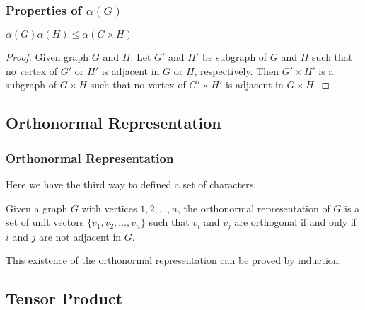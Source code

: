 \documentclass{beamer}
\begin{document}
                  \begin{frame}
                        \frametitle{Properties of $\alpha(G)$}
                        \begin{lemma}
                              $\alpha(G)\alpha(H) \leq \alpha(G \times H)$
                        \end{lemma}
            
                        \pause
            
                        \begin{proof}
                              Given graph $ G $ and $ H $. Let $ G' $ and $ H' $ be subgraph of $ G $ and $ H $ such that no vertex of $ G' $ or $ H' $ is adjacent in $ G $ or $ H $, respectively. Then $ G' \times H' $ is a subgraph of $ G \times H $ such that no vertex of $ G' \times H' $ is adjacent in $ G \times H $.
                        \end{proof}
                  \end{frame}

            \subsection{Orthonormal Representation}

                  \begin{frame}
                        \frametitle{Orthonormal Representation}

                        Here we have the third way to defined a set of characters.

                        \begin{definition}\label{def:orthonormalRepresentation}
                              Given a graph $ G $ with vertices $ 1,2,\dots,n $, the orthonormal representation of $ G $ is a set of unit vectors $ \{v_1, v_2, \dots, v_n\} $ such that $ v_i $ and $ v_j $ are orthogonal if and only if $ i $ and $ j $ are not adjacent in $ G $.
                        \end{definition}

                        \pause

                        This existence of the orthonormal representation can be proved by induction.

                  \end{frame}

            \subsection{Tensor Product}
\end{document}

